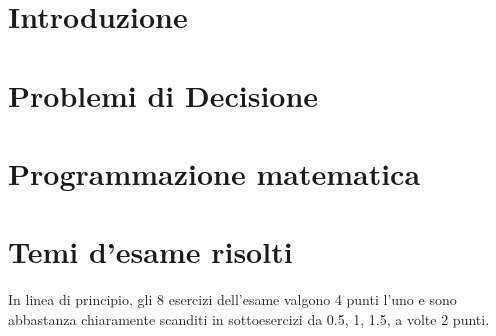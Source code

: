 \providecommand{\main}{.}









{\hypersetup{hidelinks}
  \tableofcontents  %
}

\chapter{Introduzione}


\chapter{Problemi di Decisione}

\clearpage
\chapter{Programmazione matematica}

\clearpage

\clearpage

\clearpage

\clearpage

\clearpage

\clearpage

\clearpage



\appendix
\chapter{Temi d'esame risolti}

In linea di principio, gli 8 esercizi dell'esame valgono 4 punti l'uno e sono abbastanza chiaramente scanditi in sottoesercizi da 0.5, 1, 1.5, a volte 2 punti.


\clearpage

\clearpage

\clearpage




